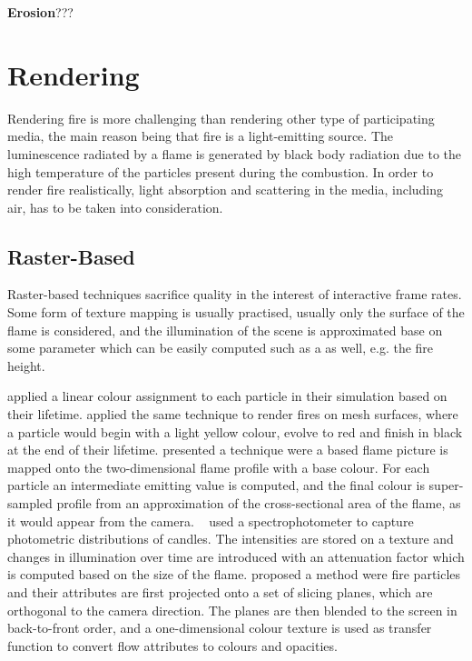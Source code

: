 \textbf{Erosion}???




\section{Rendering}
\label{sec:rendering}

Rendering fire is more challenging than rendering other type of participating media, the main reason being that fire is a light-emitting source.
The luminescence radiated by a flame is generated by black body radiation due to the high temperature of the particles present during the combustion.
In order to render fire realistically, light absorption and scattering in the media, including air, has to be taken into consideration.

\subsection{Raster-Based}
\label{sec:raster_based}

Raster-based techniques sacrifice quality in the interest of interactive frame rates.
Some form of texture mapping is usually practised, usually only the surface of the flame is considered, and the illumination of the scene is approximated base on some parameter which can be easily computed such as a as well, e.g. the fire height.

\cite{Reeves:1983} applied a linear colour assignment to each particle in their simulation based on their lifetime.
\cite{Lee:2001} applied the same technique to render fires on mesh surfaces, where a particle would begin with a light yellow colour, evolve to red and finish in black at the end of their lifetime.
\cite{Lamorlette:2002} presented a technique were a based flame picture is mapped onto the two-dimensional flame profile with a base colour.
For each particle an intermediate emitting value is computed, and the final colour is super-sampled profile from an approximation of the cross-sectional area of the flame, as it would appear from the camera.
~\cite{Bridault:2006} used a spectrophotometer to capture photometric distributions of candles.
The intensities are stored on a texture and changes in illumination over time are introduced with an attenuation factor which is computed based on the size of the flame.
\cite{Zhang:2011} proposed a method were fire particles and their attributes are first projected onto a set of slicing planes, which are orthogonal to the camera direction. 
The planes are then blended to the screen in back-to-front order, and a one-dimensional colour texture is used as transfer function to convert flow attributes to colours and opacities.


